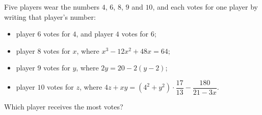 Five players wear the numbers $4$, $6$, $8$, $9$ and $10$, and each votes for one player by writing that player's number:
\begin{itemize}
\item player $6$ votes for $4$, and player $4$ votes for $6$;
\item player $8$ votes for $x$, where $x^3-12x^2+48x=64$;
\item player $9$ votes for $y$, where $2y=20-2(y-2)$;
\item player $10$ votes for $z$, where $4z+xy=(4^2+y^2)\cdot\dfrac{17}{13}-\dfrac{180}{21-3x}$.
\end{itemize}
Which player receives the most votes?

